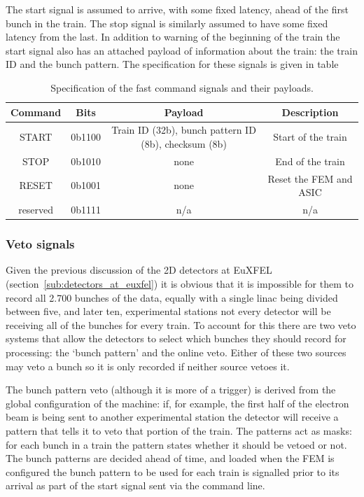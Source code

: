 The start signal is assumed to arrive, with some fixed latency, ahead of the first bunch in the train. The stop signal is similarly assumed to have some fixed latency from the last. In addition to warning of the beginning of the train the start signal also has an attached payload of information about the train: the train ID and the bunch pattern. The specification for these signals is given in table
\begin{table}
  \begin{center}
  \begin{tabular}{c | c | c | c}
    Command  & Bits   & Payload & Description \\
    \hline   
    START    & 0b1100 & Train ID (32b), bunch pattern ID (8b), checksum (8b) & Start of the train \\
    STOP     & 0b1010 & none                                                 & End of the train \\
    RESET    & 0b1001 & none                                                 & Reset the FEM and ASIC \\
    reserved & 0b1111 & n/a                                                  & n/a\\
  \end{tabular}
  \end{center}
  \caption{Specification of the fast command signals and their payloads.}
  \label{tab:fast_commands}
\end{table}
\subsubsection{Veto signals} %
\label{sub:veto_signal}
Given the previous discussion of the 2D detectors at EuXFEL (section~\ref{sub:detectors_at_euxfel}) it is obvious that it is impossible for them to record all 2.700 bunches of the data, equally with a single linac being divided between five, and later ten, experimental stations not every detector will be receiving all of the bunches for every train. To account for this there are two veto systems that allow the detectors to select which bunches they should record for processing: the `bunch pattern' and the online veto. Either of these two sources may veto a bunch so it is only recorded if neither source vetoes it. 

The bunch pattern veto (although it is more of a trigger) is derived from the global configuration of the machine: if, for example, the first half of the electron beam is being sent to another experimental station the detector will receive a pattern that tells it to veto that portion of the train. The patterns act as masks: for each bunch in a train the pattern states whether it should be vetoed or not. The bunch patterns are decided ahead of time, and loaded when the FEM is configured the bunch pattern to be used for each train is signalled prior to its arrival as part of the start signal sent via the command line.

